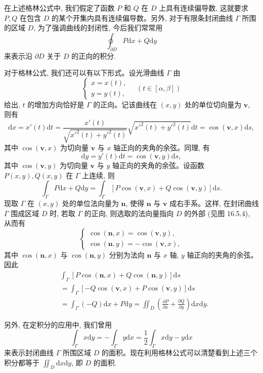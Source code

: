 在上述格林公式中, 我们假定了函数 $P$ 和 $Q$ 在 $D$ 上具有连续偏导数, 这就要求 $P,Q$ 在包含 $D$ 的某个开集内具有连续偏导数。另外, 对于有限条封闭曲线 $\Gamma$ 所围的区域 $D$, 为了强调曲线的封闭性, 今后我们常常用
\[
  \oint_{\partial D}P\mathrm dx+Q\mathrm dy
\]
来表示沿 $\partial D$ 关于 $D$ 的正向的积分.

对于格林公式, 我们还可以有以下形式。设光滑曲线 $\Gamma$ 由
\[
  \begin{cases}
    x=x(t),\\
    y=y(t),
  \end{cases}\quad (t\in[\alpha,\beta])
\]
给出, $t$ 的增加方向恰好是 $\Gamma$ 的正向。记该曲线在 $(x,y)$ 处的单位切向量为 $\boldsymbol v$, 则有
\[
  \mathrm dx=x'(t)\mathrm dt
  =\frac{x'(t)}{\sqrt{x'^2(t)+y'^2(t)}}\sqrt{x'^2(t)+y'^2(t)}\mathrm dt
  =\cos(\boldsymbol v,x)\mathrm ds,
\]
其中 $\cos(\boldsymbol v,x)$ 为切向量 $\boldsymbol v$ 与 $x$ 轴正向的夹角的余弦。同理, 有
\[
  \mathrm dy=y'(t)\mathrm dt=\cos(\boldsymbol v,y)\mathrm ds,
\]
其中 $\cos(\boldsymbol v,y)$ 为切向量 $\boldsymbol v$ 与 $y$ 轴正向的夹角的余弦。设函数 $P(x,y),Q(x,y)$ 在 $\Gamma$ 上连续, 则
\[
  \int_\Gamma P\mathrm dx+Q\mathrm dy
  =\int_\Gamma[P\cos(\boldsymbol v,x)+Q\cos(\boldsymbol v,y)]\mathrm ds.
\]
现取 $\Gamma$ 在 $(x,y)$ 处的单位法向量为 $\boldsymbol n$, 使得 $\boldsymbol n$ 与 $\boldsymbol v$ 成右手系。这样, 在封闭曲线 $\Gamma$ 围成区域 $D$ 时, 若取 $\Gamma$ 的正向, 则选取的法向量指向 $D$ 的外部 (见图 16.5.4), 从而有
\[
  \begin{cases}
    \cos(\boldsymbol n,x)=\cos(\boldsymbol v,y),\\
    \cos(\boldsymbol n,y)=-\cos(\boldsymbol v,x),
  \end{cases}
\]
其中 $\cos(\boldsymbol n,x)$ 与 $\cos(\boldsymbol n,y)$ 分别为法向 $\boldsymbol n$ 与 $x$ 轴, $y$ 轴正向的夹角的余弦。因此
\[
\begin{aligned}
  &\int_\Gamma[P\cos(\boldsymbol n,x)+Q\cos(\boldsymbol n,y)]\mathrm ds\\
  &=\int_\Gamma[-Q\cos(\boldsymbol v,x)+P\cos(\boldsymbol v,y)]\mathrm ds\\
  &=\int_\Gamma(-Q)\mathrm dx+P\mathrm dy
  =\iint_D\left(\frac{\partial P}{\partial x}+\frac{\partial Q}{\partial y}\right)\mathrm dx\mathrm dy.
\end{aligned}
\]

另外, 在定积分的应用中, 我们曾用
\[
  \int_\Gamma x\mathrm dy=-\int_\Gamma y\mathrm dx
  =\frac12\int_\Gamma x\mathrm dy-y\mathrm dx
\]
来表示封闭曲线 $\Gamma$ 所围区域 $D$ 的面积。现在利用格林公式可以清楚看到上述三个积分都等于 $\iint_D\mathrm dx\mathrm dy$, 即 $D$ 的面积.

